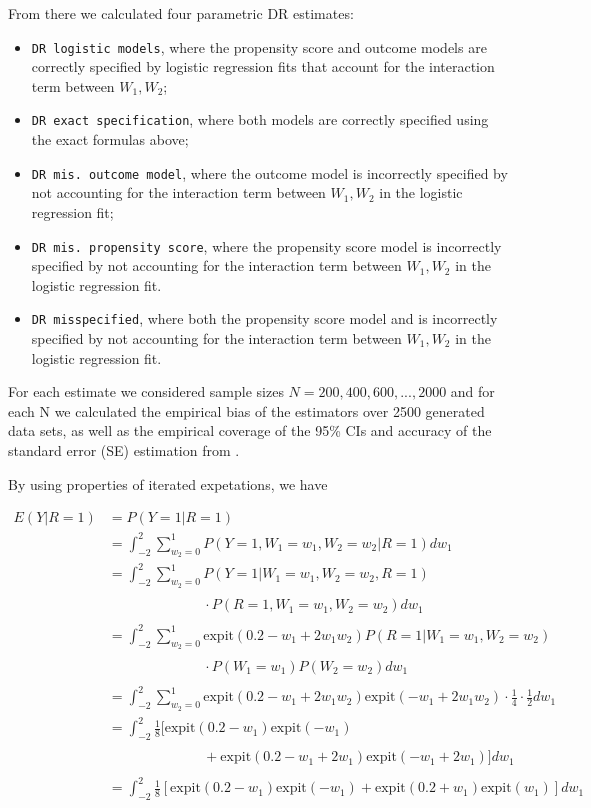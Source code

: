 \documentclass[12pt,twoside]{article}
\newcommand{\expit}{\text{expit}}
\begin{document}
From there we calculated four parametric DR estimates: 
\begin{itemize}
    \item \texttt{DR logistic models}, where the propensity score and outcome models are correctly specified by logistic regression fits that account for the interaction term between $W_1, W_2$;
    \item \texttt{DR exact specification}, where both models are correctly specified using the exact formulas above;
    \item \texttt{DR mis. outcome model}, where the outcome model is incorrectly specified by not accounting for the interaction term between $W_1, W_2$ in the logistic regression fit;
    \item \texttt{DR mis. propensity score}, where the propensity score model is incorrectly specified by not accounting for the interaction term between $W_1, W_2$ in the logistic regression fit.
    \item \texttt{DR misspecified}, where both the propensity score model and  is incorrectly specified by not accounting for the interaction term between $W_1, W_2$ in the logistic regression fit.
\end{itemize}

For each estimate we considered sample sizes $N = 200, 400, 600, ..., 2000$ and for each N we calculated the empirical bias of the estimators over 2500 generated data sets, as well as the empirical coverage of the 95\% CIs and accuracy of the standard error (SE) estimation from \citet{lunceford_davidian}.

By using properties of iterated expetations, we have

\begin{align*}
    E(Y|R = 1) &= P(Y = 1|R = 1)\\
    &= \int_{-2}^{2} \sum_{w_2 = 0}^{1} P(Y = 1, W_1 = w_1, W_2 = w_2|R = 1) dw_1 \\
    & = \int_{-2}^{2} \sum_{w_2 = 0}^{1} P(Y = 1|W_1 = w_1, W_2 = w_2, R = 1) \\
    & \phantom{ = \int_{-2}^{2} \sum_{w_2 = 0}^{1}} \cdot P(R = 1, W_1 = w_1, W_2 = w_2)dw_1 \\
    & = \int_{-2}^{2} \sum_{w_2 = 0}^{1} \expit(0.2 - w_1 + 2w_1w_2)P(R = 1|W_1 = w_1, W_2 = w_2) \\
    &\phantom{ = \int_{-2}^{2} \sum_{w_2 = 0}^{1}} \cdot P(W_1 = w_1)P(W_2 = w_2)dw_1 \\
    & = \int_{-2}^{2} \sum_{w_2 = 0}^{1} \expit(0.2 - w_1 + 2w_1w_2)\expit(-w_1+2w_1w_2) \cdot \frac{1}{4}\cdot \frac{1}{2}dw_1 \\
    & = \int_{-2}^{2} \frac{1}{8}[\expit(0.2 - w_1)\expit(-w_1) \\
    &\phantom{ = \int_{-2}^{2} \sum_{w_2 = 0}^{1}} +\expit(0.2 - w_1 + 2w_1)\expit(-w_1+2w_1)]dw_1 \\
    & = \int_{-2}^{2} \frac{1}{8}[\expit(0.2 - w_1)\expit(-w_1) +\expit(0.2 + w_1)\expit(w_1)]dw_1 \\
\end{align*}
\end{document}
